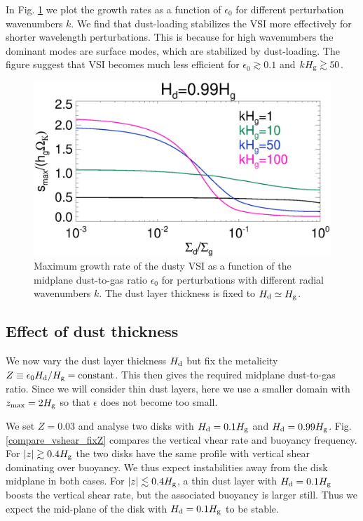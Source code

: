 In Fig. \ref{vsi_dust_loading_vareps} we plot the growth rates as a
function of $\epsilon_0$ for different perturbation wavenumbers $k$. We
find that dust-loading stabilizes the VSI more effectively for shorter
wavelength perturbations. This is because for high wavenumbers the
dominant modes are surface modes, which are stabilized by
dust-loading. The figure suggest that VSI becomes much less efficient
for $\epsilon_0\gtrsim 0.1$ and $kH_\mathrm{g}\gtrsim 50$. 

\begin{figure}
  \includegraphics[width=\linewidth]{figures/compare_eigenvals_vareps2} 
  \caption{Maximum growth rate of the dusty VSI as a function of the
    midplane dust-to-gas ratio $\epsilon_0$ for perturbations with
    different radial wavenumbers $k$. The dust layer thickness is
    fixed to $H_\mathrm{d}\simeq H_\mathrm{g}$. 
    \label{vsi_dust_loading_vareps}
    }
\end{figure}

\subsection{Effect of dust thickness} 
We now vary the dust layer thickness $H_\mathrm{d}$ but fix the metalicity 
$Z \equiv \epsilon_0 H_\mathrm{d}/H_\mathrm{g} = \text{constant}$. This then gives the
required midplane dust-to-gas ratio. Since we will consider thin dust
layers, here we use a smaller 
domain with $z_\mathrm{max}=2H_\mathrm{g}$ so that $\epsilon$ does not become
too small. 

We set $Z=0.03$ and analyse two disks with $H_\mathrm{d}=0.1H_\mathrm{g}$ and 
$H_\mathrm{d}=0.99H_\mathrm{g}$. Fig. \ref{compare_vshear_fixZ} compares the vertical
vhear rate and buoyancy frequency. For $|z|\gtrsim 0.4H_\mathrm{g}$ the two
disks have the same profile with vertical shear dominating over
buoyancy. We thus expect instabilities away from the disk midplane in 
both cases. For $|z|\lesssim 0.4H_\mathrm{g}$, a thin dust 
layer with $H_\mathrm{d}=0.1H_\mathrm{g}$ boosts the vertical shear rate, but the
associated buoyancy is larger still. Thus we expect the mid-plane of
the disk with $H_\mathrm{d}=0.1H_\mathrm{g}$ to be stable.  

